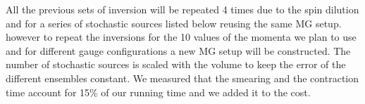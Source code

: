 All the previous sets of inversion will be repeated 4 times due to the spin dilution
and for a series of stochastic sources listed below reusing the same MG setup. 
however to repeat the inversions for the 10 values of the momenta we plan to use and 
for different gauge configurations a new MG setup will be constructed.
The number of stochastic sources is scaled with the volume to keep the error of the different ensembles constant. We measured that the smearing and the contraction time account for 15\% of our running time and we added it to the cost.

